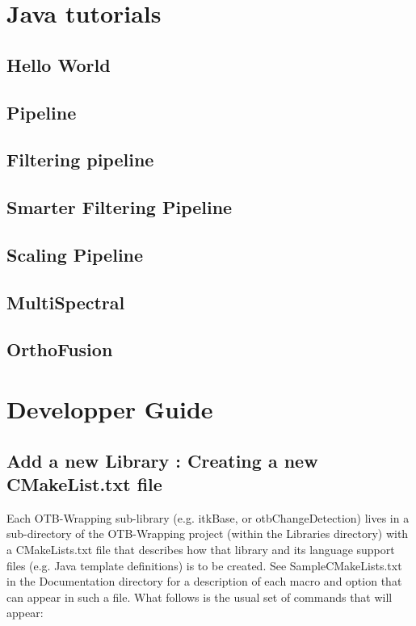 \section{Java tutorials}\label{sec:tuto}

\subsection{Hello World}


\subsection{Pipeline}


\subsection{Filtering pipeline}


\subsection{Smarter Filtering Pipeline}


\subsection{Scaling Pipeline}


\subsection{MultiSpectral}


\subsection{OrthoFusion}



\section{Developper Guide}\label{sec:dev}

\subsection{Add a new Library : Creating a new CMakeList.txt file}
Each OTB-Wrapping sub-library (e.g. itkBase, or otbChangeDetection) 
lives in a sub-directory of the OTB-Wrapping project (within the Libraries directory)
 with a CMakeLists.txt file that describes how that library and its language support files 
(e.g. Java template definitions) is to be created. 
See SampleCMakeLists.txt in the Documentation directory for a description of each macro and option that
can appear in such a file. What follows is the usual set of commands that will appear:


